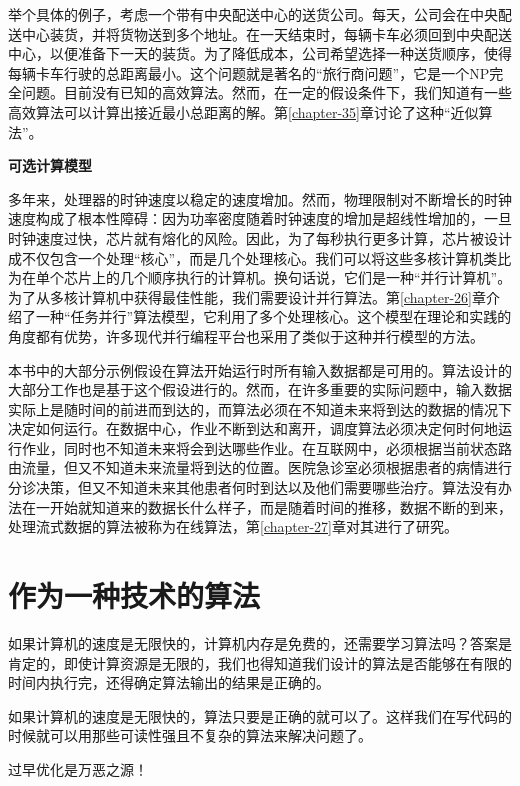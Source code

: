 \documentclass[lang=cn,newtx,10pt,scheme=chinese]{elegantbook}
\begin{document}
举个具体的例子，考虑一个带有中央配送中心的送货公司。每天，公司会在中央配送中心装货，并将货物送到多个地址。在一天结束时，每辆卡车必须回到中央配送中心，以便准备下一天的装货。为了降低成本，公司希望选择一种送货顺序，使得每辆卡车行驶的总距离最小。这个问题就是著名的``旅行商问题''，它是一个NP完全问题。目前没有已知的高效算法。然而，在一定的假设条件下，我们知道有一些高效算法可以计算出接近最小总距离的解。第\ref{chapter-35}章讨论了这种``近似算法''。

\textbf{可选计算模型}

多年来，处理器的时钟速度以稳定的速度增加。然而，物理限制对不断增长的时钟速度构成了根本性障碍：因为功率密度随着时钟速度的增加是超线性增加的，一旦时钟速度过快，芯片就有熔化的风险。因此，为了每秒执行更多计算，芯片被设计成不仅包含一个处理``核心''，而是几个处理核心。我们可以将这些多核计算机类比为在单个芯片上的几个顺序执行的计算机。换句话说，它们是一种``并行计算机''。为了从多核计算机中获得最佳性能，我们需要设计并行算法。第\ref{chapter-26}章介绍了一种``任务并行''算法模型，它利用了多个处理核心。这个模型在理论和实践的角度都有优势，许多现代并行编程平台也采用了类似于这种并行模型的方法。

本书中的大部分示例假设在算法开始运行时所有输入数据都是可用的。算法设计的大部分工作也是基于这个假设进行的。然而，在许多重要的实际问题中，输入数据实际上是随时间的前进而到达的，而算法必须在不知道未来将到达的数据的情况下决定如何运行。在数据中心，作业不断到达和离开，调度算法必须决定何时何地运行作业，同时也不知道未来将会到达哪些作业。在互联网中，必须根据当前状态路由流量，但又不知道未来流量将到达的位置。医院急诊室必须根据患者的病情进行分诊决策，但又不知道未来其他患者何时到达以及他们需要哪些治疗。算法没有办法在一开始就知道来的数据长什么样子，而是随着时间的推移，数据不断的到来，处理流式数据的算法被称为在线算法，第\ref{chapter-27}章对其进行了研究。

\section{作为一种技术的算法}\label{section-1.2}

如果计算机的速度是无限快的，计算机内存是免费的，还需要学习算法吗？答案是肯定的，即使计算资源是无限的，我们也得知道我们设计的算法是否能够在有限的时间内执行完，还得确定算法输出的结果是正确的。

如果计算机的速度是无限快的，算法只要是正确的就可以了。这样我们在写代码的时候就可以用那些可读性强且不复杂的算法来解决问题了。

\begin{marker}
    过早优化是万恶之源！
\end{marker}
\end{document}
